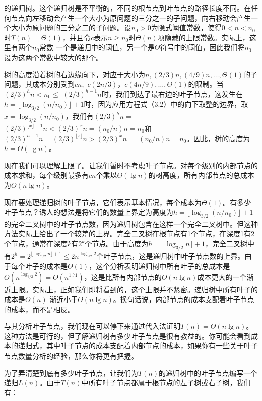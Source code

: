 \documentclass[lang=cn,newtx,10pt,scheme=chinese]{elegantbook}
\begin{document}
的递归树。这个递归树是不平衡的，不同的根节点到叶节点的路径长度不同。在任何节点向左移动会产生一个大小为原问题的三分之一的子问题，向右移动会产生一个大小为原问题的三分之二的子问题。设$n_0>0$为隐式阈值常数，使得$0<n<n_0$时$T(n)=\Theta(1)$，并且令$c$表示$n \geq n_0$时$\Theta(n)$项隐藏的上限常数。实际上，这里有两个$n_0$常数-一个是递归中的阈值，另一个是$\Theta$符号中的阈值，因此我们将$n_0$设为这两个常数中较大的那个。

树的高度沿着树的右边缘向下，对应于大小为$n,(2 / 3) n,(4 / 9) n, \ldots, \Theta(1)$的子问题，其成本分别受到$cn,$ $c(2 n / 3)$，$c(4 n / 9), \ldots, \Theta(1)$的限制。当$(2 / 3)^h n<n_0 \leq$ $(2 / 3)^{h-1} n$时，我们到达了最右边的叶子节点，这发生在$h=\lfloor\log _{3 / 2}(n / n_0)\rfloor+1$时，因为应用方程式（3.2）中的向下取整的边界，取$x=\log _{3 / 2}(n / n_0)$，我们有$(2 / 3)^h n=$ $(2 / 3)^{\lfloor x\rfloor+1} n<(2 / 3)^x n=(n_0 / n) n=n_0$和$(2 / 3)^{h-1} n=(2 / 3)^{\lfloor x\rfloor} n>(2 / 3)^x n$ $=(n_0 / n) n=n_0$。因此，树的高度为$h=\Theta(\lg n)$。

现在我们可以理解上限了。让我们暂时不考虑叶子节点。对每个级别的内部节点的成本求和，每个级别最多有$c n$个乘以$\Theta(\lg n)$的树高度，所有内部节点的总成本为$O(n \lg n)$。

现在要处理递归树的叶子节点，它们表示基本情况，每个成本为$\Theta(1)$。有多少叶子节点？诱人的想法是将它们的数量上界定为高度为$h=\lfloor\log _{3 / 2}(n / n_0)\rfloor+1$的完全二叉树中的叶子节点数，因为递归树包含在这样一个完全二叉树中。但这种方法实际上给出了一个较差的上界。完全二叉树在根节点有1个节点，在深度1有2个节点，通常在深度$k$有$2^k$个节点。由于高度为$h=\lfloor\log _{3 / 2} n\rfloor+1$，完全二叉树中有$2^h=2^{\lfloor\log _{3 / 2} n\rfloor+1} \leq 2 n^{\log _{3 / 2} 2}$个叶子节点，这是递归树中叶子节点数的上界。由于每个叶子的成本是$\Theta(1)$，这个分析表明递归树中所有叶子的总成本是$O(n^{\log _{3 / 2} 2})=O(n^{1.71})$，这是比所有内部节点的$O(n \lg n)$成本更大的一个渐近上限。实际上，正如我们即将看到的，这个上限并不紧密。递归树中所有叶子的成本是$O(n)$-渐近小于$O(n \lg n)$。换句话说，内部节点的成本支配着叶子节点的成本，而不是相反。

与其分析叶子节点，我们现在可以停下来通过代入法证明$T(n)=\Theta(n \lg n)$。这种方法是可行的，但了解递归树有多少叶子节点是很有教益的。你可能会看到成本的递归式，其中叶子节点的成本支配着内部节点的成本，如果你有一些关于叶子节点数量分析的经验，那么你将更有把握。

为了弄清楚到底有多少叶子节点，让我们为$T(n)$的递归树中的叶子节点编写一个递归$L(n)$。由于$T(n)$中所有叶子节点都属于根节点的左子树或右子树，我们有：
\end{document}
